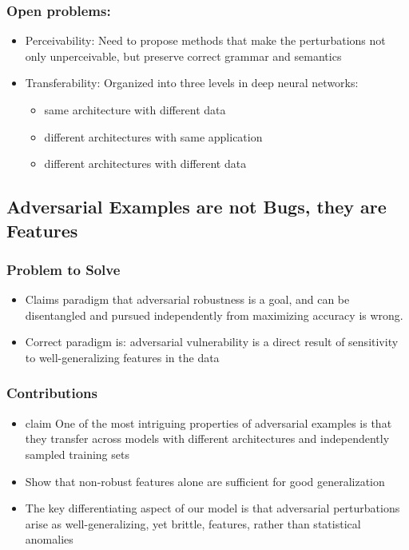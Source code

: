 \documentclass{article}
\begin{document}
\begin{flushleft}
\subsubsection*{Open problems:}
\begin{itemize}
  \item Perceivability: Need to propose methods that make the perturbations not only unperceivable, but preserve correct grammar and semantics
  \item Transferability: Organized into three levels in deep neural networks: 
  \begin{itemize}
      \item same architecture with different data
      \item different architectures with same application
      \item different architectures with different data
  \end{itemize}
\end{itemize}


 
\subsection{ Adversarial Examples are not Bugs, they are Features \cite{}} 
\subsubsection*{Problem to Solve}
\begin{itemize}
    \item Claims paradigm that adversarial robustness is a goal, and can be disentangled and pursued independently from maximizing accuracy is wrong.
    \item Correct paradigm is: adversarial vulnerability is a direct result of sensitivity to well-generalizing features in the data
\end{itemize}

\subsubsection*{Contributions}
\begin{itemize}
 \item claim One of the most intriguing properties of adversarial examples is that they transfer across models with different architectures and independently sampled training sets
 \item Show that non-robust features alone are sufficient for good generalization
 \item The key differentiating aspect of our model is that adversarial perturbations arise as well-generalizing, yet brittle, features, rather than statistical anomalies
\end{itemize}



\end{flushleft}
\end{document}
